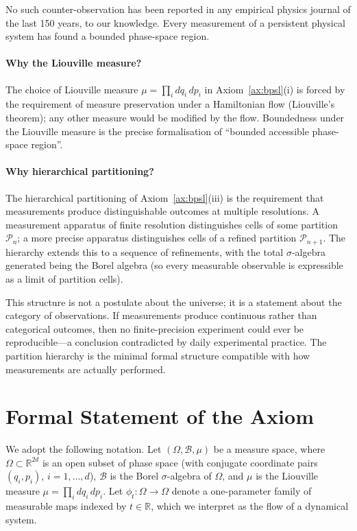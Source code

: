 \documentclass[11pt,twocolumn,a4paper]{article}
\theoremstyle{axiomstyle}
\theoremstyle{conseqstyle}
\theoremstyle{definition}
\theoremstyle{remark}
\newcommand{\Partition}{\mathcal{P}}
\newcommand{\Real}{\mathbb{R}}
\begin{document}
No such counter-observation has been reported in any empirical physics journal of the last 150 years, to our knowledge. Every measurement of a persistent physical system has found a bounded phase-space region.

\paragraph{Why the Liouville measure?} The choice of Liouville measure $\mu=\prod_{i}dq_{i}\,dp_{i}$ in Axiom~\ref{ax:bpsl}(i) is forced by the requirement of measure preservation under a Hamiltonian flow (Liouville's theorem); any other measure would be modified by the flow. Boundedness under the Liouville measure is the precise formalisation of ``bounded accessible phase-space region''.

\paragraph{Why hierarchical partitioning?} The hierarchical partitioning of Axiom~\ref{ax:bpsl}(iii) is the requirement that measurements produce distinguishable outcomes at multiple resolutions. A measurement apparatus of finite resolution distinguishes cells of some partition $\Partition_{n}$; a more precise apparatus distinguishes cells of a refined partition $\Partition_{n+1}$. The hierarchy extends this to a sequence of refinements, with the total $\sigma$-algebra generated being the Borel algebra (so every measurable observable is expressible as a limit of partition cells).

This structure is not a postulate about the universe; it is a statement about the category of observations. If measurements produce continuous rather than categorical outcomes, then no finite-precision experiment could ever be reproducible---a conclusion contradicted by daily experimental practice. The partition hierarchy is the minimal formal structure compatible with how measurements are actually performed.

\section{Formal Statement of the Axiom}
\label{sec:axiom}

We adopt the following notation. Let $(\Omega,\mathcal{B},\mu)$ be a measure space, where $\Omega\subset\Real^{2d}$ is an open subset of phase space (with conjugate coordinate pairs $(q_{i},p_{i})$, $i=1,\ldots,d$), $\mathcal{B}$ is the Borel $\sigma$-algebra of $\Omega$, and $\mu$ is the Liouville measure $\mu=\prod_{i}dq_{i}\,dp_{i}$. Let $\phi_{t}\colon\Omega\to\Omega$ denote a one-parameter family of measurable maps indexed by $t\in\Real$, which we interpret as the flow of a dynamical system.
\end{document}

